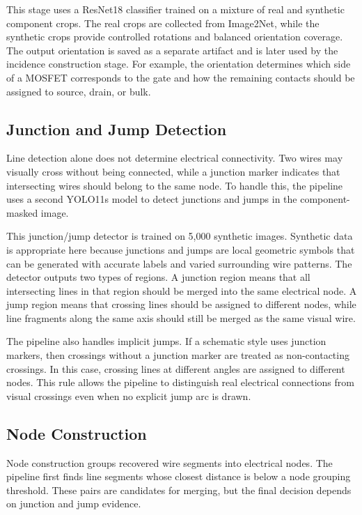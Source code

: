 This stage uses a ResNet18 classifier trained on a mixture of real and synthetic component crops. The real crops are collected from Image2Net, while the synthetic crops provide controlled rotations and balanced orientation coverage. The output orientation is saved as a separate artifact and is later used by the incidence construction stage. For example, the orientation determines which side of a MOSFET corresponds to the gate and how the remaining contacts should be assigned to source, drain, or bulk.

\subsection{Junction and Jump Detection}
\label{subsec:junction-jump-detection}

Line detection alone does not determine electrical connectivity. Two wires may visually cross without being connected, while a junction marker indicates that intersecting wires should belong to the same node. To handle this, the pipeline uses a second YOLO11s model to detect junctions and jumps in the component-masked image.

This junction/jump detector is trained on 5,000 synthetic images. Synthetic data is appropriate here because junctions and jumps are local geometric symbols that can be generated with accurate labels and varied surrounding wire patterns. The detector outputs two types of regions. A junction region means that all intersecting lines in that region should be merged into the same electrical node. A jump region means that crossing lines should be assigned to different nodes, while line fragments along the same axis should still be merged as the same visual wire.

The pipeline also handles implicit jumps. If a schematic style uses junction markers, then crossings without a junction marker are treated as non-contacting crossings. In this case, crossing lines at different angles are assigned to different nodes. This rule allows the pipeline to distinguish real electrical connections from visual crossings even when no explicit jump arc is drawn.

\subsection{Node Construction}
\label{subsec:node-construction}

Node construction groups recovered wire segments into electrical nodes. The pipeline first finds line segments whose closest distance is below a node grouping threshold. These pairs are candidates for merging, but the final decision depends on junction and jump evidence.

